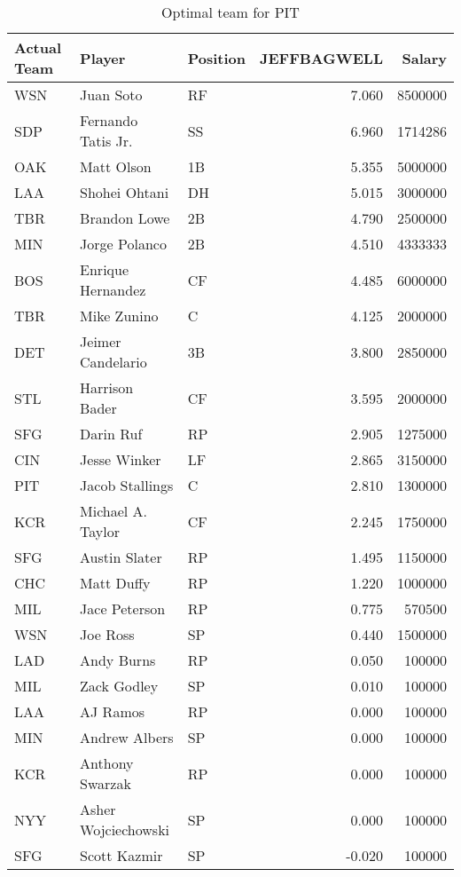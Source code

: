 \begin{table}

\caption{Optimal team for PIT}
\centering
\begin{tabular}[t]{l|l|l|r|r}
\hline
Actual Team & Player & Position & JEFFBAGWELL & Salary\\
\hline
WSN & Juan Soto & RF & 7.060 & 8500000\\
\hline
SDP & Fernando Tatis Jr. & SS & 6.960 & 1714286\\
\hline
OAK & Matt Olson & 1B & 5.355 & 5000000\\
\hline
LAA & Shohei Ohtani & DH & 5.015 & 3000000\\
\hline
TBR & Brandon Lowe & 2B & 4.790 & 2500000\\
\hline
MIN & Jorge Polanco & 2B & 4.510 & 4333333\\
\hline
BOS & Enrique Hernandez & CF & 4.485 & 6000000\\
\hline
TBR & Mike Zunino & C & 4.125 & 2000000\\
\hline
DET & Jeimer Candelario & 3B & 3.800 & 2850000\\
\hline
STL & Harrison Bader & CF & 3.595 & 2000000\\
\hline
SFG & Darin Ruf & RP & 2.905 & 1275000\\
\hline
CIN & Jesse Winker & LF & 2.865 & 3150000\\
\hline
PIT & Jacob Stallings & C & 2.810 & 1300000\\
\hline
KCR & Michael A. Taylor & CF & 2.245 & 1750000\\
\hline
SFG & Austin Slater & RP & 1.495 & 1150000\\
\hline
CHC & Matt Duffy & RP & 1.220 & 1000000\\
\hline
MIL & Jace Peterson & RP & 0.775 & 570500\\
\hline
WSN & Joe Ross & SP & 0.440 & 1500000\\
\hline
LAD & Andy Burns & RP & 0.050 & 100000\\
\hline
MIL & Zack Godley & SP & 0.010 & 100000\\
\hline
LAA & AJ Ramos & RP & 0.000 & 100000\\
\hline
MIN & Andrew Albers & SP & 0.000 & 100000\\
\hline
KCR & Anthony Swarzak & RP & 0.000 & 100000\\
\hline
NYY & Asher Wojciechowski & SP & 0.000 & 100000\\
\hline
SFG & Scott Kazmir & SP & -0.020 & 100000\\
\hline
\end{tabular}
\end{table}
